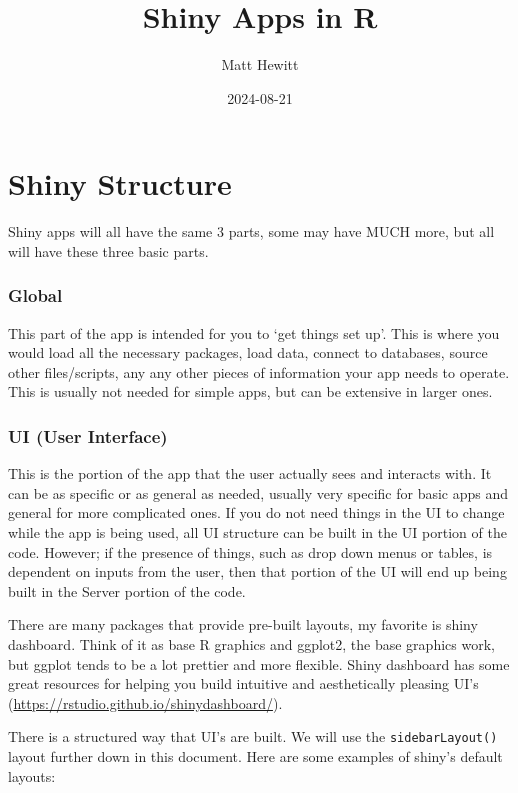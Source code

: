\documentclass[
]{article}
\title{Shiny Apps in R}
\author{Matt Hewitt}
\date{2024-08-21}
\begin{document}
\maketitle

\section{Shiny Structure}\label{shiny-structure}

Shiny apps will all have the same 3 parts, some may have MUCH more, but
all will have these three basic parts.

\subsubsection{Global}\label{global}

This part of the app is intended for you to `get things set up'. This is
where you would load all the necessary packages, load data, connect to
databases, source other files/scripts, any any other pieces of
information your app needs to operate. This is usually not needed for
simple apps, but can be extensive in larger ones.

\subsubsection{UI (User Interface)}\label{ui-user-interface}

This is the portion of the app that the user actually sees and interacts
with. It can be as specific or as general as needed, usually very
specific for basic apps and general for more complicated ones. If you do
not need things in the UI to change while the app is being used, all UI
structure can be built in the UI portion of the code. However; if the
presence of things, such as drop down menus or tables, is dependent on
inputs from the user, then that portion of the UI will end up being
built in the Server portion of the code.

There are many packages that provide pre-built layouts, my favorite is
shiny dashboard. Think of it as base R graphics and ggplot2, the base
graphics work, but ggplot tends to be a lot prettier and more flexible.
Shiny dashboard has some great resources for helping you build intuitive
and aesthetically pleasing UI's
(\url{https://rstudio.github.io/shinydashboard/}).

There is a structured way that UI's are built. We will use the
\texttt{sidebarLayout()} layout further down in this document. Here are
some examples of shiny's default layouts:\\
\end{document}
